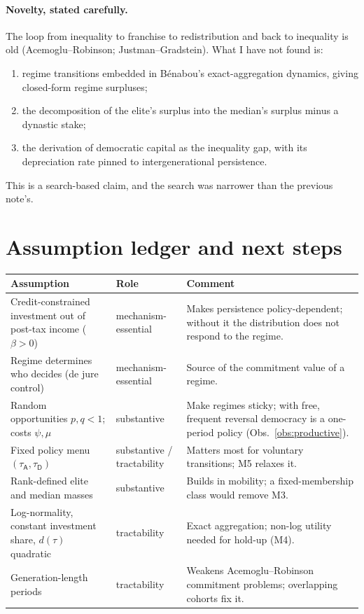 \documentclass[11pt]{article}
\theoremstyle{remark}
\newcommand{\A}{\mathsf{A}}
\newcommand{\D}{\mathsf{D}}
\begin{document}
\paragraph{Novelty, stated carefully.}  The loop from inequality to franchise to redistribution and back to inequality is old (Acemoglu--Robinson; Justman--Gradstein).  What I have not found is:
\begin{enumerate}[label=(\roman*)]
\item regime transitions embedded in B\'enabou's exact-aggregation dynamics, giving closed-form regime surpluses;
\item the decomposition of the elite's surplus into the median's surplus minus a dynastic stake;
\item the derivation of democratic capital as the inequality gap, with its depreciation rate pinned to intergenerational persistence.
\end{enumerate}
This is a search-based claim, and the search was narrower than the previous note's.

\section{Assumption ledger and next steps}

\begin{longtable}{p{}p{}p{}}
\toprule
Assumption & Role & Comment\\
\midrule
\endhead
Credit-constrained investment out of post-tax income ($\beta>0$) & mechanism-essential & Makes persistence policy-dependent; without it the distribution does not respond to the regime.\\
Regime determines who decides (de jure control) & mechanism-essential & Source of the commitment value of a regime.\\
Random opportunities $p,q<1$; costs $\psi,\mu$ & substantive & Make regimes sticky; with free, frequent reversal democracy is a one-period policy (Obs.~\ref{obs:productive}).\\
Fixed policy menu $(\tau_\A,\tau_\D)$ & substantive / tractability & Matters most for voluntary transitions; M5 relaxes it.\\
Rank-defined elite and median masses & substantive & Builds in mobility; a fixed-membership class would remove M3.\\
Log-normality, constant investment share, $d(\tau)$ quadratic & tractability & Exact aggregation; non-log utility needed for hold-up (M4).\\
Generation-length periods & tractability & Weakens Acemoglu--Robinson commitment problems; overlapping cohorts fix it.\\
\bottomrule
\end{longtable}
\end{document}
